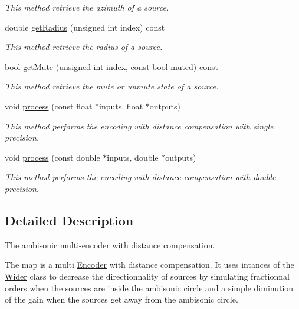\begin{DoxyCompactItemize}
\begin{DoxyCompactList}\small\item\em This method retrieve the azimuth of a source. \end{DoxyCompactList}\item 
double \hyperlink{class_hoa2_d_1_1_map_aa9587dc91fd2ebcd083136188d0d8b39}{get\-Radius} (unsigned int index) const 
\begin{DoxyCompactList}\small\item\em This method retrieve the radius of a source. \end{DoxyCompactList}\item 
bool \hyperlink{class_hoa2_d_1_1_map_ad93830d230d88312f07ccb73964ce7db}{get\-Mute} (unsigned int index, const bool muted) const 
\begin{DoxyCompactList}\small\item\em This method retrieve the mute or unmute state of a source. \end{DoxyCompactList}\item 
void \hyperlink{class_hoa2_d_1_1_map_a933daf1cc1c8ad4df486d436f6d91450}{process} (const float $\ast$inputs, float $\ast$outputs)
\begin{DoxyCompactList}\small\item\em This method performs the encoding with distance compensation with single precision. \end{DoxyCompactList}\item 
void \hyperlink{class_hoa2_d_1_1_map_aa71ff518d419b54b409043ded7b8abd4}{process} (const double $\ast$inputs, double $\ast$outputs)
\begin{DoxyCompactList}\small\item\em This method performs the encoding with distance compensation with double precision. \end{DoxyCompactList}\end{DoxyCompactItemize}


\subsection{Detailed Description}
The ambisonic multi-\/encoder with distance compensation. 

The map is a multi \hyperlink{class_hoa2_d_1_1_encoder}{Encoder} with distance compensation. It uses intances of the \hyperlink{class_hoa2_d_1_1_wider}{Wider} class to decrease the directionnality of sources by simulating fractionnal orders when the sources are inside the ambisonic circle and a simple diminution of the gain when the sources get away from the ambisonic circle.

